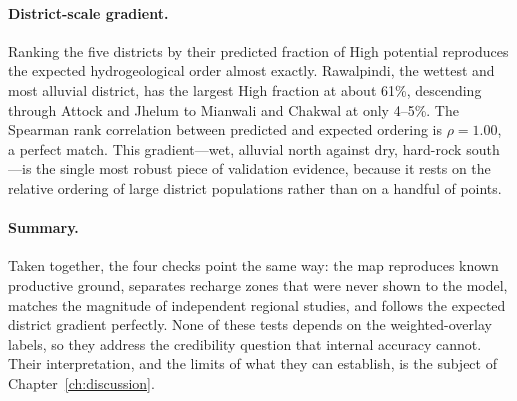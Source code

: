 \paragraph{District-scale gradient.}
Ranking the five districts by their predicted fraction of High potential
reproduces the expected hydrogeological order almost exactly. Rawalpindi, the
wettest and most alluvial district, has the largest High fraction at about 61\%,
descending through Attock and Jhelum to Mianwali and Chakwal at only 4--5\%. The
Spearman rank correlation between predicted and expected ordering is
$\rho = 1.00$, a perfect match. This gradient---wet, alluvial north against dry,
hard-rock south---is the single most robust piece of validation evidence,
because it rests on the relative ordering of large district populations rather
than on a handful of points.

\paragraph{Summary.}
Taken together, the four checks point the same way: the map reproduces known
productive ground, separates recharge zones that were never shown to the model,
matches the magnitude of independent regional studies, and follows the expected
district gradient perfectly. None of these tests depends on the weighted-overlay
labels, so they address the credibility question that internal accuracy cannot.
Their interpretation, and the limits of what they can establish, is the subject
of Chapter~\ref{ch:discussion}.
